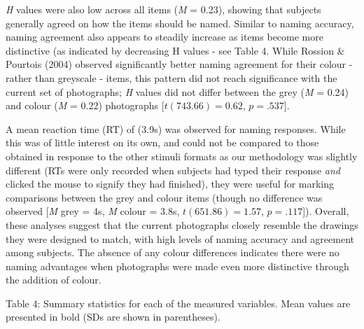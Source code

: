 \documentclass[
  11pt,
]{article}
\begin{document}
\emph{H} values were also low across all items (\emph{M} = 0.23),
showing that subjects generally agreed on how the items should be named.
Similar to naming accuracy, naming agreement also appears to steadily
increase as items become more distinctive (as indicated by decreasing H
values - see Table 4. While Rossion \& Pourtois (2004) observed
significantly better naming agreement for their colour - rather than
greyscale - items, this pattern did not reach significance with the
current set of photographs; \emph{H} values did not differ between the
grey (\emph{M} = 0.24) and colour (\emph{M} = 0.22) photographs
{[}\(t(743.66) = 0.62\), \(p = .537\){]}.

A mean reaction time (RT) of (3.9s) was observed for naming responses.
While this was of little interest on its own, and could not be compared
to those obtained in response to the other stimuli formats as our
methodology was slightly different (RTs were only recorded when subjects
had typed their response \emph{and} clicked the mouse to signify they
had finished), they were useful for marking comparisons between the grey
and colour items (though no difference was observed {[}\emph{M} grey =
4s, \emph{M} colour = 3.8s, \(t(651.86) = 1.57\), \(p = .117\){]}).
Overall, these analyses suggest that the current photographs closely
resemble the drawings they were designed to match, with high levels of
naming accuracy and agreement among subjects. The absence of any colour
differences indicates there were no naming advantages when photographs
were made even more distinctive through the addition of colour.

Table 4: Summary statistics for each of the measured variables. Mean
values are presented in bold (SDs are shown in parentheses).
\end{document}
